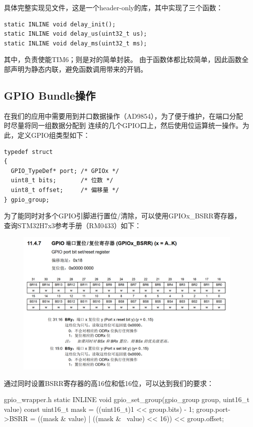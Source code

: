 具体完整实现见文件，这是一个header-only的库，其中实现了三个函数：

\begin{verbatim}
static INLINE void delay_init();
static INLINE void delay_us(uint32_t us);
static INLINE void delay_ms(uint32_t ms);
\end{verbatim}

其中，负责使能TIM6；则是对的简单封装。
由于函数体都比较简单，因此函数全部声明为静态内联，避免函数调用带来的开销。

\subsection{GPIO Bundle操作}
在我们的应用中需要用到并口数据操作（AD9854），为了便于维护，在端口分配时尽量将同一组数据分配到
连续的几个GPIO口上，然后使用位运算统一操作。为此，定义GPIO组类型如下：

\begin{verbatim}
typedef struct
{
  GPIO_TypeDef* port; /* GPIOx */
  uint8_t bits;       /* 位数 */
  uint8_t offset;     /* 偏移量 */
} gpio_group;
\end{verbatim}

为了能同时对多个GPIO引脚进行置位/清除，可以使用GPIOx\_BSRR寄存器，
查询STM32H7x3参考手册（RM0433）如下：

\begin{figure}[H]
\center
    \includegraphics[width=\textwidth]{img/bsrr.png}
\end{figure}

通过同时设置BSRR寄存器的高16位和低16位，可以达到我们的要求：

\begin{cbox}{gpio\_wrapper.h}
static INLINE void
gpio_set_group(gpio_group group, uint16_t value)
{
  const uint16_t mask = ((uint16_t)1 << group.bits) - 1;
  group.port->BSRR = ((mask & value) | ((mask & ~value) << 16)) << group.offset;
}
\end{cbox}

